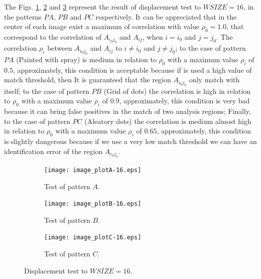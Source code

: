 The Figs. \ref{fig:choosingA16}, \ref{fig:choosingB16} and \ref{fig:choosingC16}
represent the result of displacement test to $WSIZE=16$, 
in the patterns $PA$, $PB$ and $PC$ respectively.
It can be appreciated that in the center of each image exist a maximum of correlation
with value $\rho_0=1.0$, that correspond to the correlation of  $A_{i_0 j_0}$ and $A_{ij}$,
when $i=i_0$ and  $j=j_0$. 
The correlation $\rho_i$ between $A_{i_0 j_0}$ and $A_{ij}$ to $i\neq i_0$ and  $j\neq j_0$;
to the case of pattern $PA$ (Painted with spray) is medium in relation to $\rho_0$
with a maximum value $\rho_i$ of $0.5$, approximately, this condition is acceptable
because if is used a high value of match threshold, then It is 
guaranteed that the region $A_{i_0 j_0}$ only match with itself;
to the case of pattern $PB$ (Grid of dots) the correlation is high in relation to $\rho_0$
with a maximum value $\rho_i$ of $0.9$, approximately, this condition is 
very bad because it can bring false positives in the match of two analysis regions; Finally,
to the case of pattern $PC$ (Aleatory dots) the correlation is medium almost high in relation to $\rho_0$
with a maximum value $\rho_i$ of $0.65$, approximately, this condition is
slightly dangerous because if we use a very low match threshold we can have 
an identification error of the region $A_{i_0 j_0}$.
\begin{figure}[H]
  \centering
  \begin{subfigure}[b]{0.45\textwidth}
    \texttt{[image: image\_plotA-16.eps]}
    \vspace{2pt}
    \caption{Test of pattern $A$.}
    \label{fig:choosingA16}
  \end{subfigure}
  \begin{subfigure}[b]{0.45\textwidth}
    \texttt{[image: image\_plotB-16.eps]}
    \vspace{2pt}
    \caption{Test of pattern $B$.}
    \label{fig:choosingB16}
  \end{subfigure}
  \begin{subfigure}[b]{0.45\textwidth}
    \texttt{[image: image\_plotC-16.eps]}
    \vspace{2pt}
    \caption{Test of pattern $C$.}
    \label{fig:choosingC16}
  \end{subfigure}
  \caption{Displacement test to $WSIZE=16$.}
  \label{fig:choosingAll16}
\end{figure}


